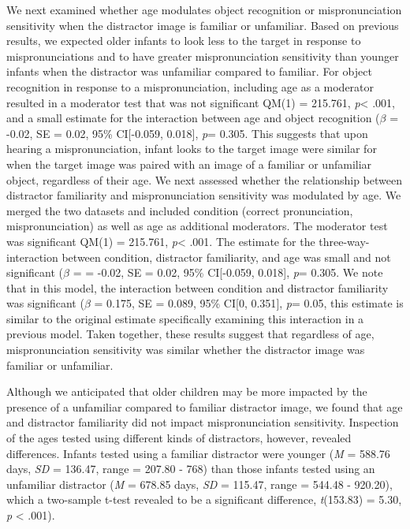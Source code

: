 \documentclass[man]{apa6}
\theoremstyle{definition}
\theoremstyle{definition}
\theoremstyle{definition}
\theoremstyle{remark}
\begin{document}
We next examined whether age modulates object recognition or
mispronunciation sensitivity when the distractor image is familiar or
unfamiliar. Based on previous results, we expected older infants to look
less to the target in response to mispronunciations and to have greater
mispronunciation sensitivity than younger infants when the distractor
was unfamiliar compared to familiar. For object recognition in response
to a mispronunciation, including age as a moderator resulted in a
moderator test that was not significant QM(1) = 215.761,
\emph{p}\textless{} .001, and a small estimate for the interaction
between age and object recognition (\(\beta\) = -0.02, SE = 0.02, 95\%
CI{[}-0.059, 0.018{]}, \emph{p}= 0.305. This suggests that upon hearing
a mispronunciation, infant looks to the target image were similar for
when the target image was paired with an image of a familiar or
unfamiliar object, regardless of their age. We next assessed whether the
relationship between distractor familiarity and mispronunciation
sensitivity was modulated by age. We merged the two datasets and
included condition (correct pronunciation, mispronunciation) as well as
age as additional moderators. The moderator test was significant QM(1) =
215.761, \emph{p}\textless{} .001. The estimate for the
three-way-interaction between condition, distractor familiarity, and age
was small and not significant (\(\beta\) = = -0.02, SE = 0.02, 95\%
CI{[}-0.059, 0.018{]}, \emph{p}= 0.305. We note that in this model, the
interaction between condition and distractor familiarity was significant
(\(\beta\) = 0.175, SE = 0.089, 95\% CI{[}0, 0.351{]}, \emph{p}= 0.05,
this estimate is similar to the original estimate specifically examining
this interaction in a previous model. Taken together, these results
suggest that regardless of age, mispronunciation sensitivity was similar
whether the distractor image was familiar or unfamiliar.

Although we anticipated that older children may be more impacted by the
presence of a unfamiliar compared to familiar distractor image, we found
that age and distractor familiarity did not impact mispronunciation
sensitivity. Inspection of the ages tested using different kinds of
distractors, however, revealed differences. Infants tested using a
familiar distractor were younger (\emph{M} = 588.76 days, \emph{SD} =
136.47, range = 207.80 - 768) than those infants tested using an
unfamiliar distractor (\emph{M} = 678.85 days, \emph{SD} = 115.47, range
= 544.48 - 920.20), which a two-sample t-test revealed to be a
significant difference, \emph{t}(153.83) = 5.30, \emph{p} \textless{}
.001).
\end{document}
